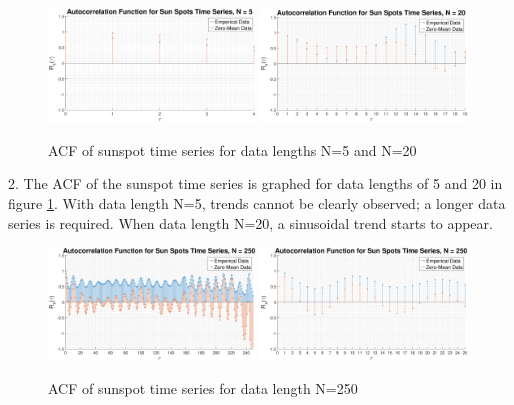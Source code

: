 \documentclass{article}
\begin{document}
\begin{figure}[H]
    \centering
    \includegraphics[width = 0.49\textwidth]{acf_sunspot_n_5}
    \includegraphics[width = 0.49\textwidth]{acf_sunspot_n_20}
    \caption{ACF of sunspot time series for data lengths N=5 and N=20}
    \label{fig:acf_sunspot_1}
\end{figure}

2. The ACF of the sunspot time series is graphed for data lengths of 5 and 20 in figure \ref{fig:acf_sunspot_1}. With data length N=5, trends cannot be clearly observed; a longer data series is required. When data length N=20, a sinusoidal trend starts to appear. 

\begin{figure}[H]
    \centering
    \includegraphics[width = 0.49\textwidth]{acf_sunspot_n_250}
    \includegraphics[width = 0.49\textwidth]{acf_sunspot_n_250_zoom}
    \caption{ACF of sunspot time series for data length N=250}
    \label{fig:acf_sunspot_2}
\end{figure}
\end{document}
